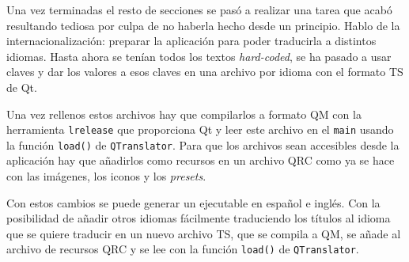 Una vez terminadas el resto de secciones se pasó a realizar una tarea que acabó resultando tediosa por culpa de no haberla hecho desde un principio. Hablo de la internacionalización: preparar la aplicación para poder traducirla a distintos idiomas. Hasta ahora se tenían todos los textos \textit{hard-coded}, se ha pasado a usar claves y dar los valores a esos claves en una archivo por idioma con el formato TS de Qt.

Una vez rellenos estos archivos hay que compilarlos a formato QM con la herramienta \texttt{lrelease} que proporciona Qt y leer este archivo en el \texttt{main} usando la función \texttt{load()} de \texttt{QTranslator}. Para que los archivos sean accesibles desde la aplicación hay que añadirlos como recursos en un archivo QRC como ya se hace con las imágenes, los iconos y los \textit{presets}.

Con estos cambios se puede generar un ejecutable en español e inglés. Con la posibilidad de añadir otros idiomas fácilmente traduciendo los títulos al idioma que se quiere traducir en un nuevo archivo TS, que se compila a QM, se añade al archivo de recursos QRC y se lee con la función \texttt{load()} de \texttt{QTranslator}.